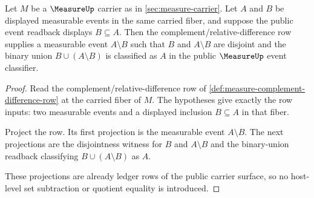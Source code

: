 \begin{theorem}
\label{thm:measure-relative-difference-disjoint-decomposition}
Let $M$ be a $\MeasureUp$ carrier as in \autoref{sec:measure-carrier}. Let
$A$ and $B$ be displayed measurable events in the same carried fiber, and
suppose the public event readback displays $B\subseteq A$. Then the
complement/relative-difference row supplies a measurable event
$A\setminus B$ such that $B$ and $A\setminus B$ are disjoint and the binary
union $B\cup(A\setminus B)$ is classified as $A$ in the public $\MeasureUp$
event classifier.
\end{theorem}
\begin{proof}
Read the complement/relative-difference row of
\autoref{def:measure-complement-difference-row} at the carried fiber of $M$.
The hypotheses give exactly the row inputs: two measurable events and a
displayed inclusion $B\subseteq A$ in that fiber.

Project the row. Its first projection is the measurable event
$A\setminus B$. The next projections are the disjointness witness for $B$ and
$A\setminus B$ and the binary-union readback classifying
$B\cup(A\setminus B)$ as $A$.

These projections are already ledger rows of the public carrier surface, so no
host-level set subtraction or quotient equality is introduced.
\end{proof}

